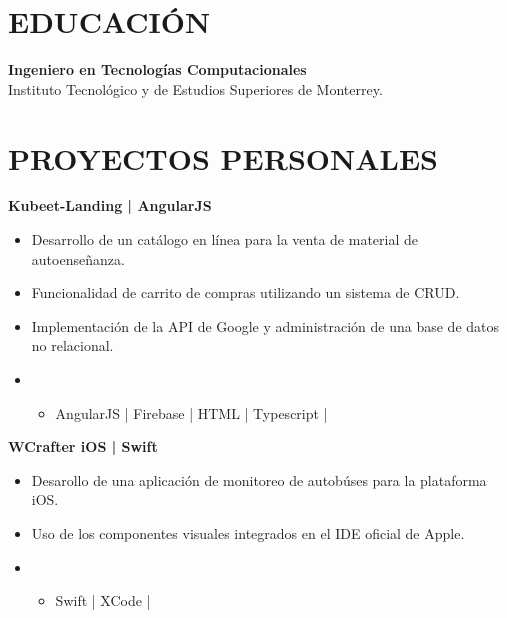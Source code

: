 \documentclass{res}
\begin{document}
\address{
}

\begin{resume}
    \separator

    \section{\large{EDUCACIÓN}} 
    \textbf{Ingeniero en Tecnologías Computacionales} 
     \\
    Instituto Tecnológico y de Estudios Superiores de Monterrey.
    
    \longjump

    \section{\large{PROYECTOS PERSONALES}} 
    \textbf{Kubeet-Landing | AngularJS} 
    \begin{itemize}
        \item Desarrollo de un catálogo en línea para la venta de material de autoenseñanza.
        \item Funcionalidad de carrito de compras utilizando un sistema de CRUD.
        \item Implementación de la API de Google y administración de una base de datos no relacional.
        \item {}
        \begin{itemize}
            \item AngularJS | Firebase | HTML | Typescript |
        \end{itemize}
    \end{itemize}

    \textbf{WCrafter iOS | Swift} 
    \begin{itemize}
        \item Desarollo de una aplicación de monitoreo de autobúses para la plataforma iOS.
        \item Uso de los componentes visuales integrados en el IDE oficial de Apple.
        \item {}
        \begin{itemize}
            \item Swift | XCode |
        \end{itemize}
    \end{itemize}


\end{resume}
\end{document}
